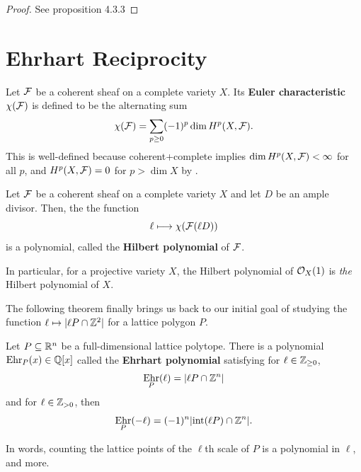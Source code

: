 \documentclass[12pt]{article}
\DeclareMathOperator{\Ehr}{Ehr}
\begin{document}
\begin{proof}
    {\color{red} See proposition 4.3.3}
\end{proof}

\section{Ehrhart Reciprocity}

\begin{defn}
    Let $\mathcal{F}$ be a coherent sheaf on a complete variety $X$. Its \textbf{Euler characteristic} $\chi(\mathcal{F})$ is defined to be the alternating sum
    \[\chi(\mathcal{F}) = \sum_{p\geq 0} (-1)^p \dim H^p(X,\mathcal{F}).\]
    This is well-defined because coherent+complete implies $\dim H^p(X,\mathcal{F})<\infty$ for all $p$, and $H^p(X,\mathcal{F})=0$ for $p>\dim X$ by \cite[Thm. III.2.7]{hartshorne}.
\end{defn}

\begin{prop}
    Let $\mathcal{F}$ be a coherent sheaf on a complete variety $X$ and let $D$ be an ample divisor. Then, the the function
    \[\ell \longmapsto \chi(\mathcal{F}(\ell D))\]
    is a polynomial, called the \textbf{Hilbert polynomial} of $\mathcal{F}$.
\end{prop}

In particular, for a projective variety $X$, the Hilbert polynomial of $\mathcal{O}_X(1)$ is \textit{the} Hilbert polynomial of $X$.

The following theorem finally brings us back to our initial goal of studying the function $\ell \mapsto |\ell P \cap \mathbb{Z}^2|$ for a lattice polygon $P$.

\begin{thm}\label{thm:ehrhart}
    Let $P\subseteq \mathbb{R}^n$ be a full-dimensional lattice polytope. There is a polynomial $\Ehr_P(x)\in \Q[x]$ called the \textbf{Ehrhart polynomial} satisfying for $\ell \in \mathbb{Z}_{\geq 0}$,
    \[\Ehr_P(\ell) = |\ell P \cap \Z^n|\]
    and for $\ell \in \mathbb{Z}_{>0}$, then
    \[\Ehr_P(-\ell) = (-1)^n |\mathrm{int}(\ell P) \cap \Z^n|.\]
\end{thm}

In words, counting the lattice points of the $\ell$th scale of $P$ is a polynomial in $\ell$, and more.
\end{document}
